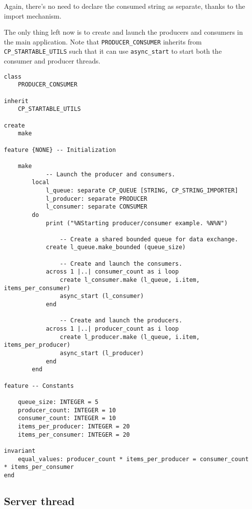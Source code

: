 Again, there's no need to declare the consumed string as separate, thanks to the import mechanism.


The only thing left now is to create and launch the producers and consumers in the main application.
Note that \lstinline!PRODUCER_CONSUMER! inherits from \lstinline!CP_STARTABLE_UTILS! such that it can use \lstinline!async_start! to start both the consumer and producer threads.

\begin{lstlisting}[language=OOSC2Eiffel, captionpos=b, caption={The producer / consumer application root class.}]
class
	PRODUCER_CONSUMER

inherit
	CP_STARTABLE_UTILS

create
	make

feature {NONE} -- Initialization

	make
			-- Launch the producer and consumers.
		local
			l_queue: separate CP_QUEUE [STRING, CP_STRING_IMPORTER]
			l_producer: separate PRODUCER
			l_consumer: separate CONSUMER
		do
			print ("%NStarting producer/consumer example. %N%N")

				-- Create a shared bounded queue for data exchange.
			create l_queue.make_bounded (queue_size)

				-- Create and launch the consumers.
			across 1 |..| consumer_count as i loop
				create l_consumer.make (l_queue, i.item, items_per_consumer)
				async_start (l_consumer)
			end

				-- Create and launch the producers.
			across 1 |..| producer_count as i loop
				create l_producer.make (l_queue, i.item, items_per_producer)
				async_start (l_producer)
			end
		end

feature -- Constants

	queue_size: INTEGER = 5
	producer_count: INTEGER = 10
	consumer_count: INTEGER = 10
	items_per_producer: INTEGER = 20
	items_per_consumer: INTEGER = 20

invariant
	equal_values: producer_count * items_per_producer = consumer_count * items_per_consumer
end
\end{lstlisting}

\subsection{Server thread}


